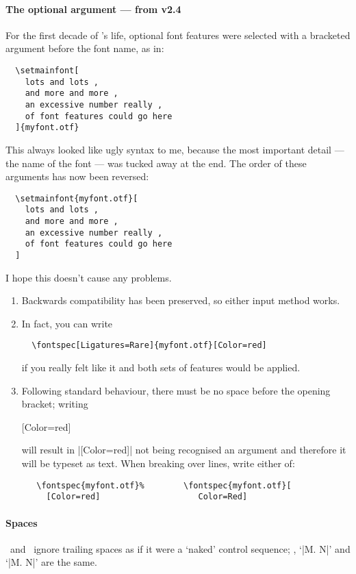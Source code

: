 \paragraph{The optional argument --- from v2.4}
For the first decade of 's life, optional font features were selected with a bracketed argument before the font name, as in:
\begin{Verbatim}
  \setmainfont[
    lots and lots ,
    and more and more ,
    an excessive number really ,
    of font features could go here
  ]{myfont.otf}
\end{Verbatim}
This always looked like ugly syntax to me, because the most important detail --- the name of the font --- was tucked away at the end.
The order of these arguments has now been reversed:
\begin{Verbatim}
  \setmainfont{myfont.otf}[
    lots and lots ,
    and more and more ,
    an excessive number really ,
    of font features could go here
  ]
\end{Verbatim}
I hope this doesn't cause any problems.
\begin{enumerate}
 \item Backwards compatibility has been preserved, so either input method works.
 \item In fact, you can write
 \begin{Verbatim}
  \fontspec[Ligatures=Rare]{myfont.otf}[Color=red]
 \end{Verbatim}
 if you really felt like it and both sets of features would be applied.

 \item
 Following standard  behaviour, there must be no space before the opening bracket; writing
 \begin{Verbatim*}
 [Color=red]
 \end{Verbatim*}
 will result in |[Color=red]| not being recognised an argument and therefore it will be typeset as text. When breaking over lines, write either of:
 \begin{Verbatim}
   \fontspec{myfont.otf}%        \fontspec{myfont.otf}[
     [Color=red]                    Color=Red]
 \end{Verbatim}

\end{enumerate}

\paragraph{Spaces}
\cmd\fontspec\ and \cmd\addfontfeatures\ ignore trailing spaces as
if it were a `naked' control sequence; \eg, `|M.  N|' and
`|M. N|' are the same.


